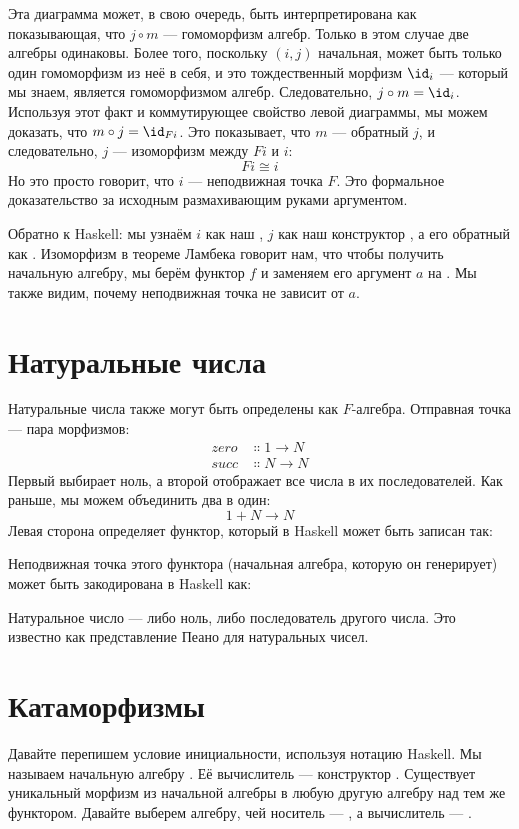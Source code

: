 \noindent
Эта диаграмма может, в свою очередь, быть интерпретирована как показывающая, что
$j \circ m$ --- гомоморфизм алгебр. Только в этом случае
две алгебры одинаковы. Более того, поскольку $(i, j)$
начальная, может быть только один гомоморфизм из неё в себя, и
это тождественный морфизм $\id_i$ --- который мы знаем, является
гомоморфизмом алгебр. Следовательно, $j \circ m = \id_i$. Используя этот
факт и коммутирующее свойство левой диаграммы, мы можем доказать, что
$m \circ j = \id_{Fi}$. Это показывает, что $m$ --- обратный
$j$, и следовательно, $j$ --- изоморфизм между
$F i$ и $i$:
\[F i \cong i\]
Но это просто говорит, что $i$ --- неподвижная точка $F$.
Это формальное доказательство за исходным размахивающим руками аргументом.

Обратно к Haskell: мы узнаём $i$ как наш ,
$j$ как наш конструктор , а его обратный как
. Изоморфизм в теореме Ламбека говорит нам, что
чтобы получить начальную алгебру, мы берём функтор $f$ и
заменяем его аргумент $a$ на . Мы также видим, почему
неподвижная точка не зависит от $a$.

\section{Натуральные числа}

Натуральные числа также могут быть определены как $F$-алгебра. Отправная точка
--- пара морфизмов:
\begin{align*}
  zero & \Colon 1 \to N \\
  succ & \Colon N \to N
\end{align*}
Первый выбирает ноль, а второй отображает все числа в их
последователей. Как раньше, мы можем объединить два в один:
\[1 + N \to N\]
Левая сторона определяет функтор, который в Haskell может быть записан
так:

Неподвижная точка этого функтора (начальная алгебра, которую он генерирует)
может быть закодирована в Haskell как:

Натуральное число --- либо ноль, либо последователь другого числа. Это
известно как представление Пеано для натуральных чисел.

\section{Катаморфизмы}

Давайте перепишем условие инициальности, используя нотацию Haskell. Мы называем
начальную алгебру . Её вычислитель --- конструктор
. Существует уникальный морфизм  из начальной
алгебры в любую другую алгебру над тем же функтором. Давайте выберем
алгебру, чей носитель --- , а вычислитель --- .

